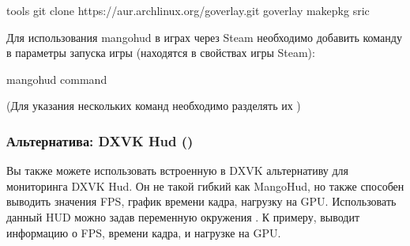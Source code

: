 \documentclass[letterpaper,10pt,russian,openany]{sphinxmanual}
\begin{document}
\begin{sphinxVerbatim}[commandchars=\\\{\}]
 tools                                         
git clone https://aur.archlinux.org/goverlay.git 
 goverlay                                      
makepkg \PYGZhy{}sric                                    
\end{sphinxVerbatim}

\sphinxAtStartPar
Для использования mangohud в играх через Steam необходимо добавить команду в параметры запуска игры (находятся в свойствах игры Steam):

\begin{sphinxVerbatim}[commandchars=\\\{\}]
mangohud \PYGZpc{}command\PYGZpc{}
\end{sphinxVerbatim}

\sphinxAtStartPar
(Для указания нескольких команд необходимо разделять их )

\sphinxAtStartPar
{}

\sphinxAtStartPar
{}

\ignorespaces 

\subsubsection{Альтернатива: DXVK Hud ()}
\label{\detokenize{source/linux-gaming:dxvk-hud-wine-proton}}\label{\detokenize{source/linux-gaming:dxvk-hud}}\label{\detokenize{source/linux-gaming:index-21}}
\sphinxAtStartPar
Вы также можете использовать встроенную в DXVK альтернативу для мониторинга \sphinxhyphen{} DXVK Hud.
Он не такой гибкий как MangoHud, но также способен выводить значения FPS, график времени кадра, нагрузку на GPU.
Использовать данный HUD можно задав переменную окружения .
К примеру,  выводит информацию о FPS, времени кадра, и нагрузке на GPU.
\end{document}
